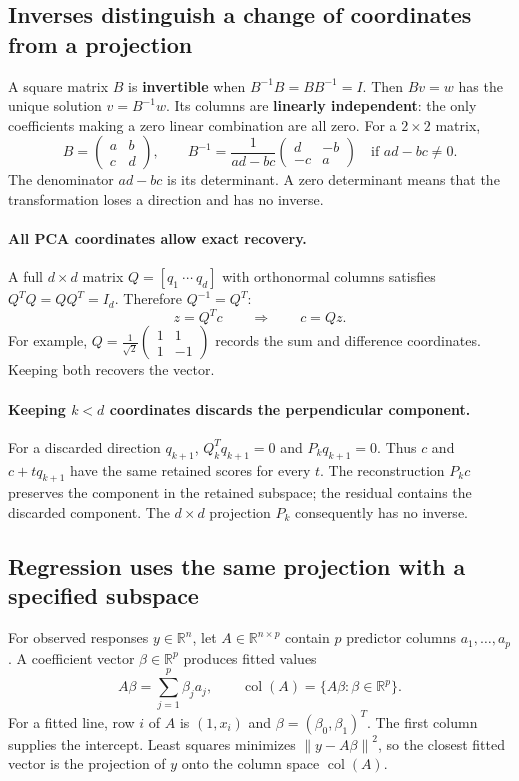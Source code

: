 \documentclass[11pt]{article}
\newcommand{\R}{\mathbb R}
\newcommand{\norm}[1]{\left\lVert#1\right\rVert}
\newcommand{\col}{\operatorname{col}}
\begin{document}
\newpage
\subsection{Inverses distinguish a change of coordinates from a projection}
A square matrix $B$ is \textbf{invertible} when $B^{-1}B=BB^{-1}=I$.
Then $Bv=w$ has the unique solution $v=B^{-1}w$. Its columns are
\textbf{linearly independent}: the only coefficients making a zero
linear combination are all zero. For a $2\times2$ matrix,
\[
 B=\begin{pmatrix}a&b\\c&d\end{pmatrix},\qquad
 \boxed{B^{-1}=\frac1{ad-bc}\begin{pmatrix}d&-b\\-c&a\end{pmatrix}}
 \quad\text{if }ad-bc\ne0.
\]
The denominator $ad-bc$ is its determinant. A zero determinant means
that the transformation loses a direction and has no inverse.

\paragraph{All PCA coordinates allow exact recovery.}
A full $d\times d$ matrix $Q=[q_1\ \cdots\ q_d]$ with orthonormal columns
satisfies $Q^TQ=QQ^T=I_d$. Therefore $Q^{-1}=Q^T$:
\[
 z=Q^Tc\qquad\Longrightarrow\qquad c=Qz.
\]
For example, $Q=\frac1{\sqrt2}
\left(\begin{smallmatrix}1&1\\1&-1\end{smallmatrix}\right)$
records the sum and difference coordinates. Keeping both recovers the vector.

\paragraph{Keeping $k<d$ coordinates discards the perpendicular component.}
For a discarded direction $q_{k+1}$, $Q_k^Tq_{k+1}=0$ and
$P_kq_{k+1}=0$. Thus $c$ and $c+tq_{k+1}$ have the same retained scores
for every $t$. The reconstruction $P_kc$ preserves the component in the
retained subspace; the residual contains the discarded component.
The $d\times d$ projection $P_k$ consequently has no inverse.

\subsection{Regression uses the same projection with a specified subspace}
For observed responses $y\in\R^n$, let $A\in\R^{n\times p}$ contain
$p$ predictor columns $a_1,\ldots,a_p$. A coefficient vector
$\beta\in\R^p$ produces fitted values
\[
 A\beta=\sum_{j=1}^p\beta_ja_j,\qquad
 \col(A)=\{A\beta:\beta\in\R^p\}.
\]
For a fitted line, row $i$ of $A$ is $(1,x_i)$ and
$\beta=(\beta_0,\beta_1)^T$. The first column supplies the intercept.
Least squares minimizes $\norm{y-A\beta}^2$, so the closest fitted vector
is the projection of $y$ onto the column space $\col(A)$.
\end{document}
